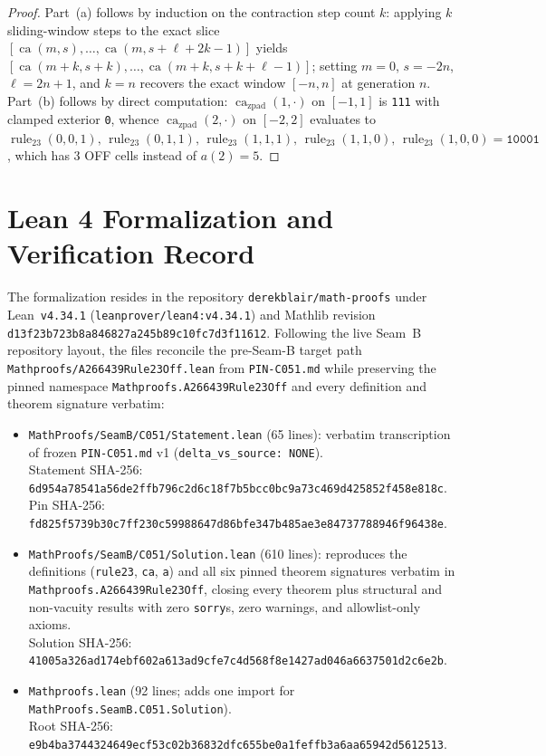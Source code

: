 \documentclass[11pt]{article}
\theoremstyle{definition}
\newcommand{\ruleTT}{\operatorname{rule}_{23}}
\newcommand{\ca}{\operatorname{ca}}
\begin{document}
\begin{proof}
Part~(a) follows by induction on the contraction step count $k$: applying $k$ sliding-window steps to the exact slice $[\ca(m, s), \dots, \ca(m, s + \ell + 2k - 1)]$ yields $[\ca(m + k, s + k), \dots, \ca(m + k, s + k + \ell - 1)]$; setting $m = 0$, $s = -2n$, $\ell = 2n + 1$, and $k = n$ recovers the exact window $[-n, n]$ at generation $n$. Part~(b) follows by direct computation: $\ca_{\mathrm{zpad}}(1, \cdot)$ on $[-1, 1]$ is \texttt{111} with clamped exterior \texttt{0}, whence $\ca_{\mathrm{zpad}}(2, \cdot)$ on $[-2, 2]$ evaluates to $\ruleTT(0,0,1),\,\ruleTT(0,1,1),\,\ruleTT(1,1,1),\,\ruleTT(1,1,0),\,\ruleTT(1,0,0) = \mathtt{10001}$, which has $3$ OFF cells instead of $a(2) = 5$.
\end{proof}

\section{Lean 4 Formalization and Verification Record}

The formalization resides in the repository \texttt{derekblair/math-proofs} under Lean~\texttt{v4.34.1} (\nolinkurl{leanprover/lean4:v4.34.1}) and Mathlib revision {\small\nolinkurl{d13f23b723b8a846827a245b89c10fc7d3f11612}}. Following the live Seam~B repository layout, the files reconcile the pre-Seam-B target path \nolinkurl{Mathproofs/A266439Rule23Off.lean} from \texttt{PIN-C051.md} while preserving the pinned namespace \nolinkurl{Mathproofs.A266439Rule23Off} and every definition and theorem signature verbatim:
\begin{itemize}\setlength{\itemsep}{2pt}
\item \nolinkurl{MathProofs/SeamB/C051/Statement.lean} (65 lines): verbatim transcription of frozen \texttt{PIN-C051.md} v1 (\texttt{delta\_vs\_source: NONE}).\\
Statement SHA-256: {\small\nolinkurl{6d954a78541a56de2ffb796c2d6c18f7b5bcc0bc9a73c469d425852f458e818c}}.\\
Pin SHA-256: {\small\nolinkurl{fd825f5739b30c7ff230c59988647d86bfe347b485ae3e84737788946f96438e}}.
\item \nolinkurl{MathProofs/SeamB/C051/Solution.lean} (610 lines): reproduces the definitions (\texttt{rule23}, \texttt{ca}, \texttt{a}) and all six pinned theorem signatures verbatim in \nolinkurl{Mathproofs.A266439Rule23Off}, closing every theorem plus structural and non-vacuity results with zero \texttt{sorry}s, zero warnings, and allowlist-only axioms.\\
Solution SHA-256: {\small\nolinkurl{41005a326ad174ebf602a613ad9cfe7c4d568f8e1427ad046a6637501d2c6e2b}}.
\item \nolinkurl{Mathproofs.lean} (92 lines; adds one import for \nolinkurl{MathProofs.SeamB.C051.Solution}).\\
Root SHA-256: {\small\nolinkurl{e9b4ba3744324649ecf53c02b36832dfc655be0a1feffb3a6aa65942d5612513}}.
\end{itemize}
\end{document}
